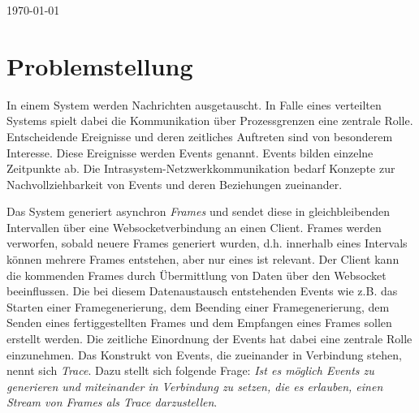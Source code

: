 \documentclass[a4paper]{article}
\begin{document}
\begin{titlepage}
	
	\vfill\vfill\vfill %
	
	{\large \today} %
	
	
	\vfill\vfill
	
	
	\vfill %
	
\end{titlepage}

\tableofcontents
\newpage
{}

\section{Problemstellung}
	In einem System werden Nachrichten ausgetauscht. In Falle eines verteilten Systems spielt dabei die Kommunikation über Prozessgrenzen eine zentrale Rolle.
	Entscheidende Ereignisse und deren zeitliches Auftreten sind von besonderem Interesse. Diese Ereignisse werden Events genannt. Events bilden einzelne Zeitpunkte ab. Die Intrasystem-Netzwerkkommunikation bedarf Konzepte zur Nachvollziehbarkeit von Events und deren Beziehungen zueinander. 
	
	Das System generiert asynchron \emph{Frames} und sendet diese in gleichbleibenden Intervallen über eine Websocketverbindung an einen Client. Frames werden verworfen, sobald neuere Frames generiert wurden, d.h. innerhalb eines Intervals können mehrere Frames entstehen, aber nur eines ist relevant. Der Client kann die kommenden Frames durch Übermittlung von Daten über den Websocket beeinflussen. Die bei diesem Datenaustausch entstehenden Events wie z.B. das Starten einer Framegenerierung, dem Beending einer Framegenerierung, dem Senden eines fertiggestellten Frames und dem Empfangen eines Frames sollen erstellt werden. Die zeitliche Einordnung der Events hat dabei eine zentrale Rolle einzunehmen. Das Konstrukt von Events, die zueinander in Verbindung stehen, nennt sich \emph{Trace}. Dazu stellt sich folgende Frage: \emph{Ist es möglich Events zu generieren und miteinander in Verbindung zu setzen, die es erlauben, einen Stream von Frames als Trace darzustellen}.
\end{document}
